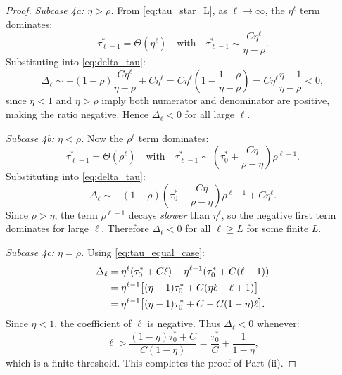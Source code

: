 \begin{proof}
\textit{Subcase 4a: $\eta > \rho$.} From \eqref{eq:tau_star_L}, as $\ell \to \infty$, the $\eta^{\ell}$ term dominates:
\begin{equation}
\tau^{*}_{\ell-1} = \Theta(\eta^{\ell}) \quad\text{with}\quad
\tau^{*}_{\ell-1} \sim \frac{C\eta^{\ell}}{\eta-\rho}.
\end{equation}
Substituting into \eqref{eq:delta_tau}:
\begin{equation*}
\Delta_{\ell} \sim -(1-\rho)\frac{C\eta^{\ell}}{\eta-\rho} + C\eta^{\ell}
= C\eta^{\ell}\left(1 - \frac{1-\rho}{\eta-\rho}\right)
= C\eta^{\ell}\frac{\eta - 1}{\eta - \rho} < 0,
\end{equation*}
since $\eta < 1$ and $\eta > \rho$ imply both numerator and denominator are positive, making the ratio negative. Hence $\Delta_{\ell} < 0$ for all large $\ell$.

\textit{Subcase 4b: $\eta < \rho$.} Now the $\rho^{\ell}$ term dominates:
\begin{equation}
\tau^{*}_{\ell-1} = \Theta(\rho^{\ell}) \quad\text{with}\quad
\tau^{*}_{\ell-1} \sim \left(\tau^{*}_{0} + \frac{C\eta}{\rho-\eta}\right)\rho^{\ell-1}.
\end{equation}
Substituting into \eqref{eq:delta_tau}:
\begin{equation*}
\Delta_{\ell} \sim -(1-\rho)\left(\tau^{*}_{0} + \frac{C\eta}{\rho-\eta}\right)\rho^{\ell-1} + C\eta^{\ell}.
\end{equation*}
Since $\rho > \eta$, the term $\rho^{\ell-1}$ decays \emph{slower} than $\eta^{\ell}$, so the negative first term dominates for large $\ell$. Therefore $\Delta_{\ell} < 0$ for all $\ell \geq \bar{L}$ for some finite $\bar{L}$.

\textit{Subcase 4c: $\eta = \rho$.} Using \eqref{eq:tau_equal_case}:
\begin{align}
\Delta_{\ell} &= \eta^{\ell}(\tau^{*}_{0} + C\ell) - \eta^{\ell-1}(\tau^{*}_{0} + C(\ell-1)) \notag \\
&= \eta^{\ell-1}\bigl[(\eta-1)\tau^{*}_{0} + C(\eta\ell - \ell + 1)\bigr] \notag \\
&= \eta^{\ell-1}\bigl[(\eta-1)\tau^{*}_{0} + C - C(1-\eta)\ell\bigr].
\end{align}
Since $\eta < 1$, the coefficient of $\ell$ is negative. Thus $\Delta_{\ell} < 0$ whenever:
\begin{equation}
\ell > \frac{(1-\eta)\tau^{*}_{0} + C}{C(1-\eta)} = \frac{\tau^{*}_{0}}{C} + \frac{1}{1-\eta},
\end{equation}
which is a finite threshold. This completes the proof of Part (ii).


\end{proof}
